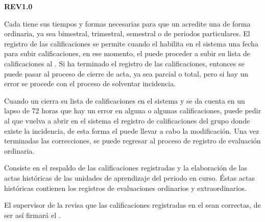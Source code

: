 \begin{PDescripcion}
	
	\Ppaso \textbf{REV1.0}
	
	\begin{enumerate}
		
		\Ppaso[\PSubProceso]  Cada  tiene sus tiempos y formas necesarias para que un  acredite una  de forma ordinaria, ya sea bimestral, trimestral, semestral o de periodos particulares. El registro de las calificaciones se permite cuando el  habilita en el sistema  una fecha para subir calificaciones, en ese momento, el  puede proceder a subir su lista de calificaciones al .
		Si ha terminado el registro de las calificaciones, entonces se puede pasar al proceso de cierre de acta, ya sea parcial o total, pero si hay un error se procede con el proceso de solventar incidencia.
		
		\Ppaso[\PSubProceso]  Cuando un  cierra su lista de calificaciones en el sistema  y se da cuenta en un lapso de 72 horas que hay un error en alguna o algunas calificaciones, puede pedir al  que vuelva a abrir en el sistema  el registro de calificaciones del grupo donde existe la incidencia, de esta forma el  puede llevar a cabo la modificación.
		Una vez terminadas las correcciones, se puede regresar al proceso de registro de evaluación ordinaria.
		
		\Ppaso[\PSubProceso]  Consiste en el respaldo de las calificaciones registradas y la elaboración de las actas históricas de las unidades de aprendizaje del periodo en curso. Éstas actas históricas contienen los registros de evaluaciones ordinarios y extraordinarios.
		
		\Ppaso[\PSubProceso]  El supervisor de la  revisa que las calificaciones registradas en el  sean correctas, de ser así firmará el . 
		

\end{enumerate}
\end{PDescripcion}
